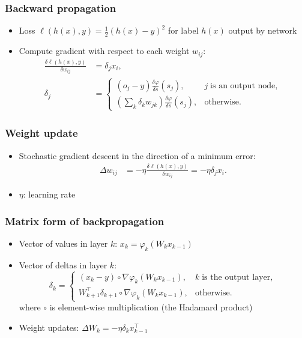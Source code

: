 \documentclass[10pt]{beamer}
\begin{document}
\begin{frame}
\frametitle{Backward propagation}
\begin{itemize}
\item Loss $\ell(h(x),y)=\frac{1}{2}(h(x)-y)^2$ for label $h(x)$ output by network
\item Compute gradient with respect to each weight $w_{ij}$:
\begin{align*}
\frac{\delta \ell(h(x),y)}{\delta w_{ij}}&=\delta_jx_i,\\
\delta_j&=\left\{
\begin{array}{ll}
(o_j-y)\frac{\delta\varphi}{\delta s}(s_j), & j\;\text{is an output node},\\
(\sum_k \delta_kw_{jk})\frac{\delta\varphi}{\delta s}(s_j), & \text{otherwise}.
\end{array}
\right.
\end{align*}
\end{itemize}
\end{frame}

\begin{frame}
\frametitle{Weight update}
\begin{itemize}
\item Stochastic gradient descent in the direction of a minimum error:
\begin{align*}
\Delta w_{ij} &= -\eta\frac{\delta \ell(h(x),y)}{\delta w_{ij}} = -\eta\delta_jx_i.
\end{align*}
\item $\eta$: learning rate
\end{itemize}
\end{frame}

\begin{frame}
\frametitle{Matrix form of backpropagation}
\begin{itemize}
\item Vector of values in layer $k$: $x_k = \varphi_k(W_k x_{k-1})$
\item Vector of deltas in layer $k$:
\[
\delta_k=\left\{
\begin{array}{ll}
(x_k-y) \circ \nabla \varphi_k(W_k x_{k-1}), & k\;\text{is the output layer},\\
W_{k+1}^\top \delta_{k+1} \circ \nabla \varphi_k(W_k x_{k-1}), & \text{otherwise}.
\end{array}
\right.
\]
where $\circ$ is element-wise multiplication (the {\color{red} Hadamard product})
\item Weight updates: $\Delta W_k = -\eta \delta_k x_{k-1}^\top$
\end{itemize}
\end{frame}
\end{document}
